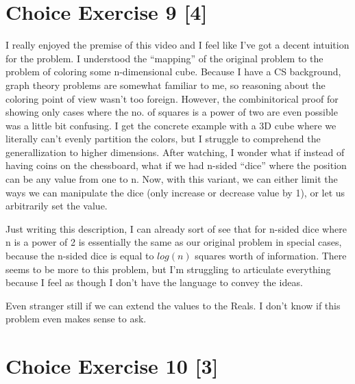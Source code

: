 \documentclass{article}
\begin{document}
\section*{Choice Exercise 9 [4]}

I really enjoyed the premise of this video and I feel like I've got a decent 
intuition for the problem. I understood the ``mapping'' of the original problem to 
the problem of coloring some n-dimensional cube. Because I have a CS background, 
graph theory problems are somewhat familiar to me, so reasoning about the coloring 
point of view wasn't too foreign. However, the combinitorical proof for showing 
only cases where the no. of squares is a power of two are even possible was a little 
bit confusing. I get the concrete example with a 3D cube where we literally can't 
evenly partition the colors, but I struggle to comprehend the generallization to 
higher dimensions. After watching, I wonder what if instead of having coins on 
the chessboard, what if we had n-sided ``dice'' where the position can be any 
value from one to n. Now, with this variant, we can either limit the ways we can 
manipulate the dice (only increase or decrease value by 1), or let us arbitrarily 
set the value. 

Just writing this description, I can already sort of see that for n-sided dice 
where n is a power of 2 is essentially the same as our original problem in special 
cases, because the n-sided dice is equal to \(log(n)\) squares worth of information. 
There seems to be more to this problem, but I'm struggling to articulate everything 
because I feel as though I don't have the language to convey the ideas. 

Even stranger still if we can extend the values to the Reals. I don't know if 
this problem even makes sense to ask. 

\section*{Choice Exercise 10 [3]}
\end{document}
